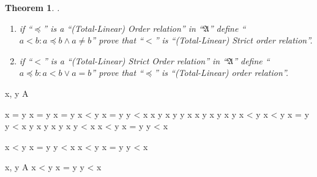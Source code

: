 \documentclass[10pt,a4paper]{book}
\newtheorem{theorem}{Theorem}[section]
\begin{document}
\begin{theorem}.
    \begin{enumerate}
        \setlength{\itemsep}{0pt} %
        \item       if ``$\preceq $'' is a ``(Total-Linear) Order relation'' in ``$\mathfrak{A}$''
              define ``$a < b : a \preceq b \land a \not= b $'' prove that ``$< $''
              is ``(Total-Linear) Strict order relation''.
        \item       if ``$< $'' is a ``(Total-Linear) Strict Order relation'' in
              ``$\mathfrak{A}$'' define ``$a \preceq b : a < b \lor a = b $'' prove that
              ``$\preceq $'' is ``(Total-Linear) order relation''.
    \end{enumerate}

\end{theorem}

\begin{fitchproof}[arrayenv=tabular]

    \open
     {x, y \in A} 

     {x = y \lor x \not= y} 
    \open
     {x = y} 
     {x < y \lor x = y \lor y < x} 
    \close
    \open
     {x \neq y} 
     {x \preceq y \lor y \preceq x} 
    \open
     {x \preceq y} 
     {x \preceq y \land x \neq y} 
     {x < y} 
     {x < y \lor x = y \lor y < x} 
    \close
    \open
     {y \preceq x} 
     {y \preceq x \land y \neq x} 
     {y < x} 
     {x < y \lor x = y \lor y < x} 
    \close

     {x < y \lor x = y \lor y < x} 
    \close
     {x < y \lor x = y \lor y < x} 
    \close

     {\forall x, y \in A \quad x < y \lor x = y \lor y < x} 

\end{fitchproof}
\end{document}
